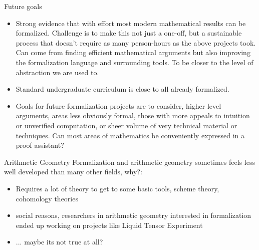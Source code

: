 \documentclass{beamer}
\theoremstyle{plain}
\begin{document}
\begin{frame}{Future goals}
    \begin{itemize}
        \item
    Strong evidence that with effort most modern mathematical results can be formalized.
    Challenge is to make this not just a one-off, but a sustainable process that doesn't require as many person-hours as the above projects took.
    Can come from finding efficient mathematical arguments but also improving the formalization language and surrounding tools. To be closer to the level of abstraction we are used to. \pause

        \item
    Standard undergraduate curriculum is close to all already formalized.
             \pause

        \item
    Goals for future formalization projects are to consider, higher level arguments, areas less obviously formal, those with more appeals to intuition or unverified computation, or sheer volume of very technical material or techniques.
    Can most areas of mathematics be conveniently expressed in a proof assistant?
    \end{itemize}
\end{frame}

\begin{frame}{Arithmetic Geometry}
    Formalization and arithmetic geometry sometimes feels less well developed than many other fields, why?:
    \begin{itemize}
        \item Requires a lot of theory to get to some basic tools, scheme theory, cohomology theories \pause
        \item social reasons, researchers in arithmetic geometry interested in formalization ended up working on projects like Liquid Tensor Experiment  \pause
        \item ... maybe its not true at all? 
    \end{itemize}
\end{frame}
\end{document}
